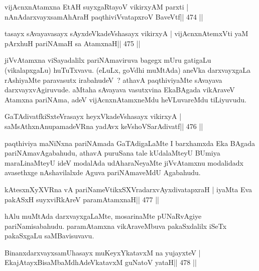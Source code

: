 

\begin{shl}
vijAcnxnAtamxna EtAH suyxgaRtayoV vikirxyAM parxti |
nAnAdarxvayxsamAhAraH paqthiviVvatapxroV BaveVtf\hfill || 474 ||
\end{shl}

\begin{shl}
tasayx sAvayavasayx sAyxdeVkadeVshasayx vikirxyA |
vijAcnxnAtemxVti yaM pArxhuH pariNAmaH sa AtamxnaH\hfill || 475 ||
\end{shl}

\begin{artha}
jiVvAtamxna viSayadalilx pariNAmaviruva bagegx mUru gatigaLu (vikalapxgaLu) huTuTxvavu. (eLuLx, goVdhi muMtAda) aneVka darxvayxgaLa rAshiyaMte paravasutx irabahudeV~? athavA paqthiviyaMte sAvayava darxvayxvAgiruvude. aMtaha sAvayava vasutxvina EkaBAgada vikAraveV Atamxna pariNAma, adeV vijAcnxnAtamxneMdu heVLuvareMdu tiLiyuvudu.
\end{artha}



\begin{shl}
GaTAdivatfkiSxteVrasayx heyxVkadeVshasayx vikirxyA |
saMsAthxnAnupamadeVRna yadAvx keVshoVSarAdivatf\hfill || 476 ||
\end{shl}

\begin{artha}
paqthiviya maNiNxna pariNAmada GaTAdigaLaMte I barxhamxda Eka BAgada
pariNAmavAgabahudu, athavA puruSana tale kUdalaMteyU BUmiya
maraLinaMteyU ideV modalAda udAharaNeyaMte jiVvAtamxnu modalidadx
avasethxge nAshavilalxde Aguva pariNAmaveMdU Agabahudu.
\end{artha}

\begin{shl}
kAtesxnXyXVRna vA pariNameVtikxSXVradarxvAyxdivatapxraH |
iyaMta Eva pakASxH suyxviRkAreV paramAtamxnaH\hfill || 477 ||
\end{shl}

\begin{artha}
hAlu muMtAda darxvayxgaLaMte, mosarinaMte pUNaRvAgiye pariNamisabahudu. paramAtamxna vikAraveMbuva pakaSxdalilx iSeTx pakaSxgaLu saMBavisuvavu.
\end{artha}


\begin{shl}
BinanxdarxvayxsamUhasayx muKeyxYkatavxM na yujayxteV |
EkajAtayxBisaMbaMdhAdeVkatavxM guNatoV yataH\hfill || 478 ||
\end{shl}

